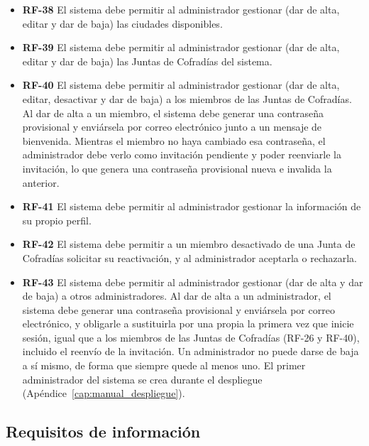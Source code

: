 \begin{itemize}
    \item \textbf{RF-38}  El sistema debe permitir al administrador gestionar (dar de alta, editar y dar de baja) las ciudades disponibles.

    \item \textbf{RF-39}  El sistema debe permitir al administrador gestionar (dar de alta, editar y dar de baja) las Juntas de Cofradías del sistema.

    \item \textbf{RF-40}  El sistema debe permitir al administrador gestionar (dar de alta, editar, desactivar y dar de baja) a los miembros de las Juntas de Cofradías. Al dar de alta a un miembro, el sistema debe generar una contraseña provisional y enviársela por correo electrónico junto a un mensaje de bienvenida. Mientras el miembro no haya cambiado esa contraseña, el administrador debe verlo como invitación pendiente y poder reenviarle la invitación, lo que genera una contraseña provisional nueva e invalida la anterior.

    \item \textbf{RF-41}  El sistema debe permitir al administrador gestionar la información de su propio perfil.

    \item \textbf{RF-42}  El sistema debe permitir a un miembro desactivado de una Junta de Cofradías solicitar su reactivación, y al administrador aceptarla o rechazarla.

    \item \textbf{RF-43}  El sistema debe permitir al administrador gestionar (dar de alta y dar de baja) a otros administradores. Al dar de alta a un administrador, el sistema debe generar una contraseña provisional y enviársela por correo electrónico, y obligarle a sustituirla por una propia la primera vez que inicie sesión, igual que a los miembros de las Juntas de Cofradías (RF-26 y RF-40), incluido el reenvío de la invitación. Un administrador no puede darse de baja a sí mismo, de forma que siempre quede al menos uno. El primer administrador del sistema se crea durante el despliegue (Apéndice~\ref{cap:manual_despliegue}).

\end{itemize}


\subsection{Requisitos de información}
 
